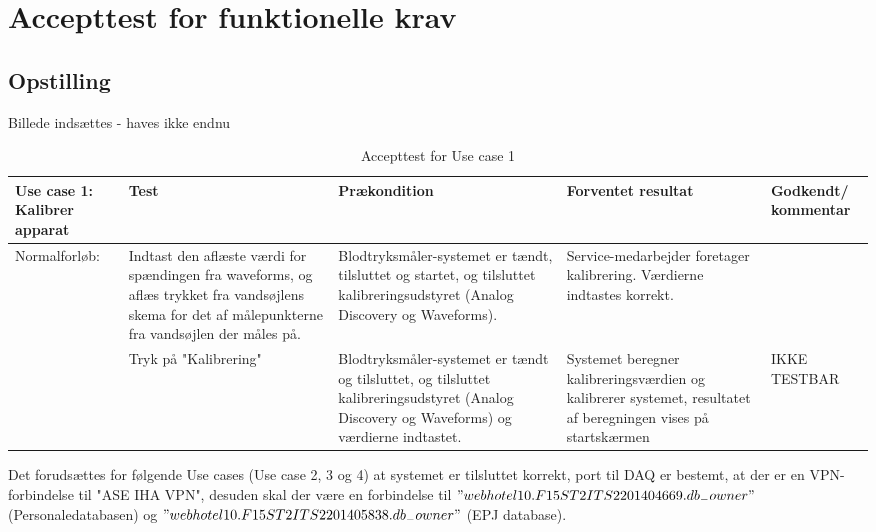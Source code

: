 \section{Accepttest for funktionelle krav}
\subsection{Opstilling}
Billede indsættes - haves ikke endnu
\\
\begin{table}[H]
\caption{Accepttest for Use case 1}\label{tab:tabel8}
\begin{tabular}{|>{\raggedright\arraybackslash}p{2.5cm}| >{\raggedright\arraybackslash}p{2.9cm} | >{\raggedright\arraybackslash}p{2.9cm} | >{\raggedright\arraybackslash}p{2.9cm} | >{\raggedright\arraybackslash}p{2.8cm} |}
   \hline
   \textbf{Use case 1: Kalibrer apparat} &\textbf{Test}& \textbf{Prækondition} & \textbf{Forventet resultat} & \textbf{Godkendt/ kommentar}\\ \hline
   Normalforløb: & Indtast den aflæste værdi for spændingen fra waveforms, og aflæs trykket fra vandsøjlens skema for det af målepunkterne fra vandsøjlen der måles på. & Blodtryksmåler-systemet er tændt, tilsluttet og startet, og tilsluttet kalibreringsudstyret (Analog Discovery og Waveforms). & Service-medarbejder foretager kalibrering. Værdierne indtastes korrekt. & \\\hline
   & Tryk på "Kalibrering" & Blodtryksmåler-systemet er tændt og tilsluttet, og tilsluttet kalibreringsudstyret (Analog Discovery og Waveforms) og værdierne indtastet. &
   Systemet beregner kalibreringsværdien og kalibrerer systemet, resultatet af beregningen vises på startskærmen & IKKE TESTBAR\\\hline
\end{tabular}
\end{table}
Det forudsættes for følgende Use cases (Use case 2, 3 og 4) at systemet er tilsluttet korrekt, port til DAQ er bestemt, at der er en VPN-forbindelse til "ASE IHA VPN", desuden skal der være en forbindelse til $"webhotel10.F15ST2ITS2201404669.db_{-}owner"$(Personaledatabasen) og $"webhotel10.F15ST2ITS2201405838.db_{-}owner"$ (EPJ database).
